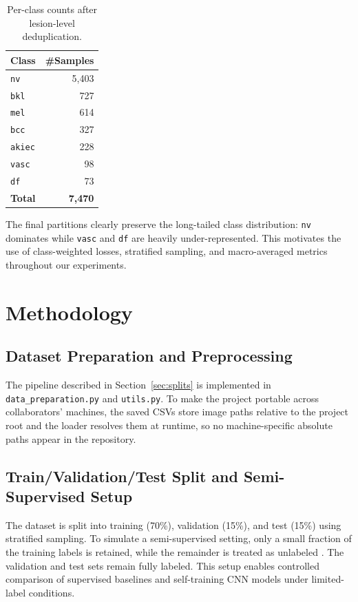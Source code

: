 \documentclass[conference]{IEEEtran}
\begin{document}
\begin{table}[h]
\centering
\caption{Per-class counts after lesion-level deduplication.}
\label{tab:classdist}
\begin{tabular}{lr}
\hline
\textbf{Class} & \textbf{\#Samples} \\ \hline
\texttt{nv}    & 5{,}403 \\
\texttt{bkl}   &   727 \\
\texttt{mel}   &   614 \\
\texttt{bcc}   &   327 \\
\texttt{akiec} &   228 \\
\texttt{vasc}  &    98 \\
\texttt{df}    &    73 \\
\hline
\textbf{Total} & \textbf{7{,}470} \\
\hline
\end{tabular}
\end{table}

The final partitions clearly preserve the long-tailed class
distribution: \texttt{nv} dominates while \texttt{vasc} and
\texttt{df} are heavily under-represented. This motivates the use of
class-weighted losses, stratified sampling, and macro-averaged
metrics throughout our experiments.

\section{Methodology}
\label{sec:method}

\subsection{Dataset Preparation and Preprocessing}
The pipeline described in Section~\ref{sec:splits} is implemented
in \texttt{data\_preparation.py} and \texttt{utils.py}. To make the
project portable across collaborators' machines, the saved CSVs
store image paths relative to the project root and the loader
resolves them at runtime, so no machine-specific absolute paths
appear in the repository.

\subsection{Train/Validation/Test Split and Semi-Supervised Setup}
The dataset is split into training (70\%), validation (15\%), and
test (15\%) using stratified sampling. To simulate a semi-supervised
setting, only a small fraction of the training labels is retained,
while the remainder is treated as unlabeled \cite{codella2019}. The
validation and test sets remain fully labeled. This setup enables
controlled comparison of supervised baselines and self-training CNN
models under limited-label conditions.
\end{document}
